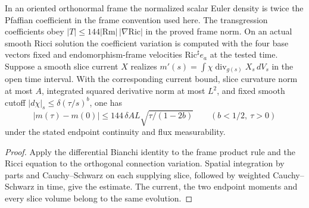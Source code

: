 \begin{proposition}
\label{prop:ed03-spatial-euler-flux}
\leanok
In an oriented orthonormal frame the normalized scalar Euler density is
twice the Pfaffian coefficient in the frame convention used here. The
transgression coefficients obey $|T|\le144|\mathrm{Rm}|\,|\nabla\mathrm{Ric}|$
in the proved frame norm. On an actual smooth Ricci solution the coefficient
variation is computed with the four base vectors fixed and endomorphism-frame
velocities $\mathrm{Ric}^{\sharp}e_a$ at the tested time. Suppose a smooth slice current $X$ realizes
$m'(s)=\int\chi\operatorname{div}_{g(s)}X_s\,dV_s$ in the open time interval.
With the corresponding current bound, slice curvature norm at most $A$,
integrated squared derivative norm at most $L^2$, and fixed smooth cutoff
$|d\chi|_s\le\delta(\tau/s)^b$, one has
\[
 |m(\tau)-m(0)|\le144\,\delta A L\sqrt{\tau/(1-2b)}
 \qquad (b<1/2,\ \tau>0)
\]
under the stated endpoint continuity and flux measurability.
\end{proposition}
\begin{proof}
\leanok
Apply the differential Bianchi identity to the frame product rule and the
Ricci equation to the orthogonal connection variation. Spatial integration
by parts and Cauchy--Schwarz on each supplying slice, followed by weighted
Cauchy--Schwarz in time, give the estimate. The current, the two endpoint
moments and every slice volume belong to the same evolution.
\end{proof}
